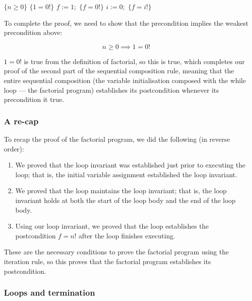 \begin{example}
\begin{algorithmic}[0]
\State $\{n \geq 0\}$
\State $\{1 = 0!\}$
\State $f := 1;$
\State $\{f = 0!\}$
\State $i := 0;$
\State $\{f = i!\}$
\end{algorithmic}

To complete the proof, we need to show that the precondition implies the weakest precondition above:

\begin{displaymath}
 n \geq 0 \implies 1 = 0!
\end{displaymath}

$1 = 0!$ is true from the definition of factorial, so this is true, which completes our proof of the second part of the sequential composition rule, meaning that the entire sequential composition (the variable initialisation composed with the while loop --- the factorial program) establishes its postcondition whenever its precondition it true.

\subsubsection*{A re-cap}

To recap the proof of the factorial program, we did the following (in reverse order):

\begin{enumerate}

 \item We proved that the loop invariant was established just prior to executing the loop; that is, the initial variable assignment established the loop invariant.

 \item We proved that the loop maintains the loop invariant; that is, the loop invariant holds at both the start of the loop body and the end of the loop body.

 \item Using our loop invariant, we proved that the loop establishes the postcondition $f = n!$ after the loop finishes executing.

\end{enumerate}

These are the necessary conditions to prove the factorial program using the iteration rule, so this proves that the factorial program establishes its postcondition. 

\end{example}

\subsubsection*{Loops and termination}

